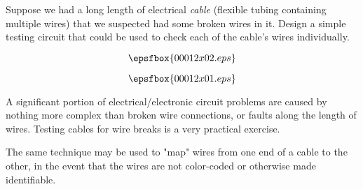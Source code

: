 

Suppose we had a long length of electrical {\it cable} (flexible tubing containing multiple wires) that we suspected had some broken wires in it.  Design a simple testing circuit that could be used to check each of the cable's wires individually.

$$\epsfbox{00012x02.eps}$$







$$\epsfbox{00012x01.eps}$$







A significant portion of electrical/electronic circuit problems are caused by nothing more complex than broken wire connections, or faults along the length of wires.  Testing cables for wire breaks is a very practical exercise.

The same technique may be used to "map" wires from one end of a cable to the other, in the event that the wires are not color-coded or otherwise made identifiable.





